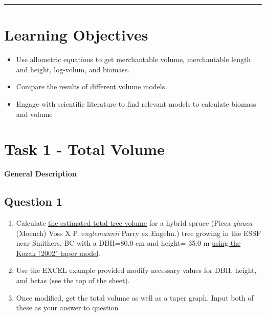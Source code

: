\documentclass[
  letterpaper,
]{book}
\providecommand{\tightlist}{%
  \setlength{\itemsep}{0pt}\setlength{\parskip}{0pt}}\usepackage{longtable,booktabs,array}
\begin{document}
\begin{center}\rule{0.5\linewidth}{0.5pt}\end{center}

\hypertarget{learning-objectives-4}{%
\section*{Learning Objectives}\label{learning-objectives-4}}


\begin{itemize}
\tightlist
\item
  Use allometric equations to get merchantable volume, merchantable
  length and height, log-volum, and biomass.
\item
  Compare the results of different volume models.
\item
  Engage with scientific literature to find relevant models to calculate
  biomass and volume
\end{itemize}

\hypertarget{task-1---total-volume}{%
\section*{Task 1 - Total Volume}\label{task-1---total-volume}}


\textbf{General Description}

\hypertarget{question-1-4}{%
\subsection*{Question 1}\label{question-1-4}}

\begin{enumerate}
\def\labelenumi{\arabic{enumi}.}
\tightlist
\item
  Calculate \ul{the estimated total tree volume} for a hybrid spruce
  (Picea \emph{glauca} (Moench) Voss X P. e\emph{nglemannii} Parry ex
  Engelm.) tree growing in the ESSF near Smithers, BC with a DBH=80.0 cm
  and height= 35.0 m \ul{using the Kozak (2002) taper model}.
\item
  Use the EXCEL example provided modify necessary values for DBH,
  height, and betas (see the top of the sheet).
\item
  Once modified, get the total volume as well as a taper graph. Input
  both of these as your answer to question
\end{enumerate}
\end{document}
